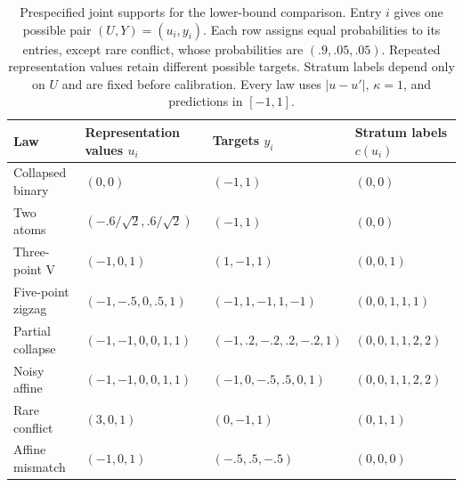 \begin{table}[t]
\centering\footnotesize
\setlength{\tabcolsep}{3pt}
\begin{tabular}{llll}
\toprule
Law & Representation values $u_i$ & Targets $y_i$ & Stratum labels $c(u_i)$ \\
\midrule
Collapsed binary & $(0,0)$ & $(-1,1)$ & $(0,0)$ \\
Two atoms & $(-.6/\sqrt2,.6/\sqrt2)$ & $(-1,1)$ & $(0,0)$ \\
Three-point V & $(-1,0,1)$ & $(1,-1,1)$ & $(0,0,1)$ \\
Five-point zigzag & $(-1,-.5,0,.5,1)$ & $(-1,1,-1,1,-1)$ & $(0,0,1,1,1)$ \\
Partial collapse & $(-1,-1,0,0,1,1)$ & $(-1,.2,-.2,.2,-.2,1)$ & $(0,0,1,1,2,2)$ \\
Noisy affine & $(-1,-1,0,0,1,1)$ & $(-1,0,-.5,.5,0,1)$ & $(0,0,1,1,2,2)$ \\
Rare conflict & $(3,0,1)$ & $(0,-1,1)$ & $(0,1,1)$ \\
Affine mismatch & $(-1,0,1)$ & $(-.5,.5,-.5)$ & $(0,0,0)$ \\
\bottomrule
\end{tabular}
\caption{Prespecified joint supports for the lower-bound comparison. Entry $i$ gives one possible pair $(U,Y)=(u_i,y_i)$. Each row assigns equal probabilities to its entries, except rare conflict, whose probabilities are $(.9,.05,.05)$. Repeated representation values retain different possible targets. Stratum labels depend only on $U$ and are fixed before calibration. Every law uses $|u-u'|$, $\kappa=1$, and predictions in $[-1,1]$.}
\label{tab:witness-laws}
\end{table}

